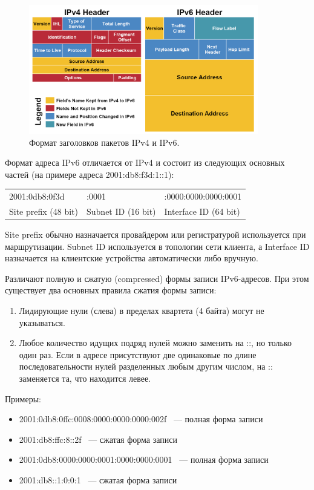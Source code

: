 \documentclass[10pt, a5paper]{article}
\begin{document}
\begin{figure}[h!]
  \centering
  \includegraphics[width=10cm]{Semernik2}
  \caption{Формат заголовков пакетов IPv4 и IPv6. ~\cite{Semernik-3}}
\end{figure}


Формат адреса IPv6 отличается от IPv4 и состоит из следующих основных частей (на примере адреса 2001:db8:f3d:1::1):

\begin{table}[h!]
  \centering
  \begin{tabular}{ l l l }
    2001:0db8:0f3d  & :0001  & :0000:0000:0000:0001  \\
     Site prefix (48 bit)  &  Subnet ID (16 bit)  &  Interface ID (64 bit)  \\
  \end{tabular}
\end{table}

Site prefix обычно назначается провайдером или регистратурой используется при маршрутизации. Subnet ID используется в топологии сети клиента, а Interface ID назначается на клиентские устройства автоматически либо вручную.

Различают полную и сжатую (compressed) формы записи IPv6-адресов. При этом существует два основных правила сжатия формы записи:

\begin{enumerate}
  \item Лидирующие нули (слева) в пределах квартета (4 байта) могут не указываться.
  \item Любое количество идущих подряд нулей можно заменить на ::, но только один раз. Если в адресе присутствуют две одинаковые по длине последовательности нулей разделенных любым другим числом, на :: заменяется та, что находится левее.
\end{enumerate}

Примеры: 
\begin{itemize}
\item 2001:0db8:0ffc:0008:0000:0000:0000:002f ~--- полная форма записи 
\item 2001:db8:ffc:8::2f ~--- сжатая форма записи 
\item 2001:0db8:0000:0000:0001:0000:0000:0001 ~--- полная форма записи 
\item 2001:db8::1:0:0:1 ~--- сжатая форма записи
\end{itemize}
\end{document}
